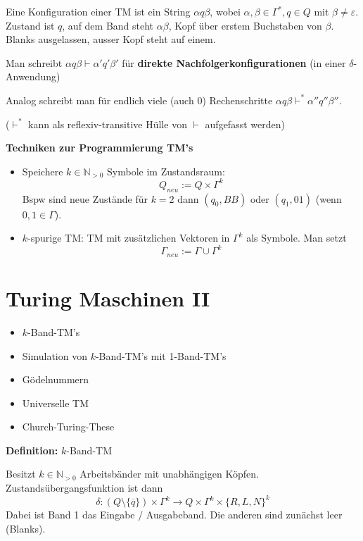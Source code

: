 \documentclass[a4paper,graphics,11pt]{article}
\newcommand{\eps}[0]{\varepsilon}
\begin{document}
Eine Konfiguration einer TM ist ein String $\alpha q \beta$, wobei $\alpha,\beta \in \Gamma^*,q \in Q$
mit $\beta \neq \eps$.\\
Zustand ist $q$, auf dem Band steht $\alpha\beta$, Kopf über erstem Buchstaben von $\beta$.\\
Blanks ausgelassen, ausser Kopf steht auf einem.

Man schreibt $\alpha q\beta \vdash \alpha'q'\beta'$ für \textbf{direkte Nachfolgerkonfigurationen}
(in einer $\delta$-Anwendung)

Analog schreibt man für endlich viele (auch 0) Rechenschritte $\alpha q \beta \vdash^* \alpha''q''\beta''$.

($\vdash^*$ kann als reflexiv-transitive Hülle von $\vdash$ aufgefasst werden)

\strut

\textbf{Techniken zur Programmierung TM's}

\begin{itemize}
    \item  Speichere $k \in \mathbb{N}_{>0}$ Symbole im Zustandsraum:
        $$
            Q_{neu} := Q \times \Gamma^k
        $$
        Bspw sind neue Zustände für $k = 2$ dann $(q_0, BB)$ oder $(q_1, 01)$ (wenn $0,1 \in \Gamma$).\\

    \item $k$-spurige TM: TM mit zusätzlichen Vektoren in $\Gamma^k$ als Symbole. Man setzt
        $$
            \Gamma_{neu} := \Gamma \cup \Gamma^k
        $$
\end{itemize}



\newpage



\section{Turing Maschinen II}
\begin{itemize}
    \item $k$-Band-TM's
    \item Simulation von $k$-Band-TM's mit 1-Band-TM's
    \item Gödelnummern
    \item Universelle TM
    \item Church-Turing-These
\end{itemize}

\textbf{Definition:} $k$-Band-TM

Besitzt $k \in \mathbb{N}_{>0}$ Arbeitsbänder mit unabhängigen Köpfen.
Zustandsübergangsfunktion ist dann
$$
    \delta : (Q\setminus \{\overline{q}\}) \times \Gamma^k \to Q \times \Gamma^k \times \{R,L,N\}^k
$$
Dabei ist Band 1 das Eingabe / Ausgabeband. Die anderen sind zunächst leer (Blanks).
\end{document}
